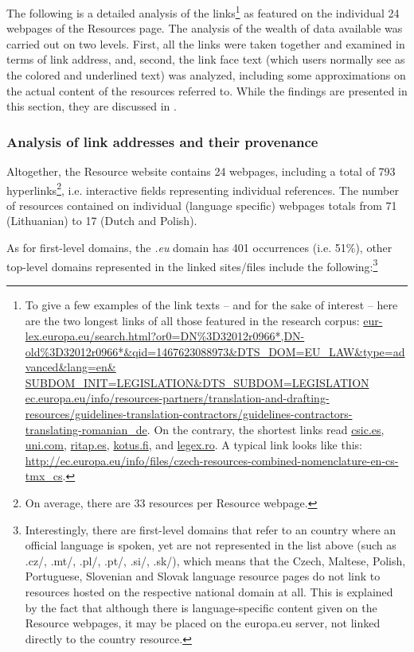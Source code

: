 \documentclass[output=paper]{langsci/langscibook}
\begin{document}
The following is a detailed analysis of the links\footnote{To give a few examples of the link texts – and for the sake of interest – here are the two longest links of all those featured in the research corpus: 
\url{eur-lex.europa.eu/search.html?or0=DN\%3D32012r0966*,DN-old\%3D32012r0966*&qid=1467623088973&DTS_DOM=EU_LAW&type=advanced&lang=en& SUBDOM_INIT=LEGISLATION&DTS_SUBDOM=LEGISLATION}
\url{ec.europa.eu/info/resources-partners/translation-and-drafting-resources/guidelines-translation-contractors/guidelines-contractors-translating-romanian_de}. On the contrary, the shortest links read 
\url{csic.es}, 
\url{uni.com},
\url{ritap.es},
\url{kotus.fi}, and 
\url{legex.ro}.
A typical link looks like this:
\url{http://ec.europa.eu/info/files/czech-resources-combined-nomenclature-en-cs-tmx_cs}.} as featured on the individual 24 webpages of the  Resources page. The analysis of the wealth of data available was carried out on two levels. First, all the links were taken together and examined in terms of link address, and, second, the link face text (which users normally see as the colored and underlined text) was analyzed, including some approximations on the actual content of the resources referred to. While the findings are presented in this section, they are discussed in .

\largerpage
\subsubsection{Analysis of link addresses and their provenance}\label{sec:svoboda:4.4.1}

Altogether, the  Resource website contains 24 webpages, including a total of 793 hyperlinks\footnote{On average, there are 33 resources per Resource webpage.}, i.e. interactive fields representing individual references. The number of resources contained on individual (language specific) webpages totals from 71 (Lithuanian) to 17 (Dutch and Polish).

As for first-level domains, the \textit{.eu} domain has 401 occurrences (i.e. 51\%), other top-level domains represented in the linked sites/files include the following:\footnote{Interestingly, there are  first-level domains that refer to an  country where an  official language is spoken, yet are not represented in the list above (such as .cz/, .mt/, .pl/, .pt/, .si/, .sk/), which means that the Czech, Maltese, Polish, Portuguese, Slovenian and Slovak language resource pages do not link to resources hosted on the respective national domain at all. This is explained by the fact that although there is language-specific content given on the Resource webpages, it may be placed on the europa.eu server, not linked directly to the country resource.}
\end{document}
